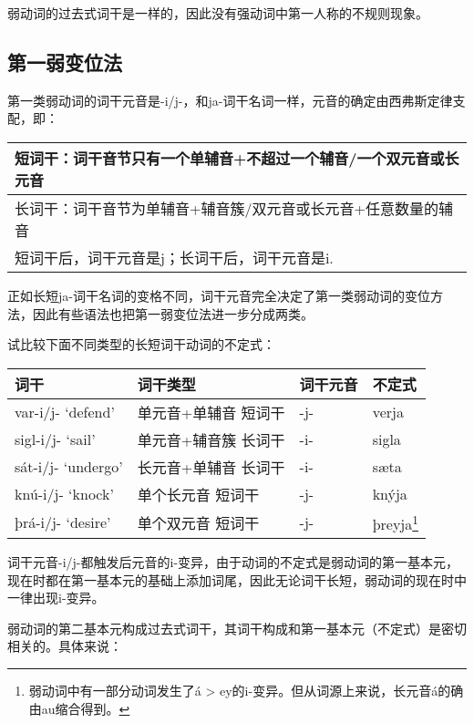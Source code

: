 弱动词的过去式词干是一样的，因此没有强动词中第一人称的不规则现象。

\subsection{第一弱变位法}\label{第一弱变位法}

第一类弱动词的词干元音是-i/j-，和ja-词干名词一样，元音的确定由西弗斯定律支配，即：

\begin{longtable}{l}
  \toprule
  短词干：词干音节只有一个单辅音+不超过一个辅音/一个双元音或长元音 \\
  \midrule
  \endhead
  \bottomrule
  \endfoot
  长词干：词干音节为单辅音+辅音簇/双元音或长元音+任意数量的辅音  \\
  短词干后，词干元音是j；长词干后，词干元音是i.          \\
\end{longtable}

正如长短ja-词干名词的变格不同，词干元音完全决定了第一类弱动词的变位方法，因此有些语法也把第一弱变位法进一步分成两类。

试比较下面不同类型的长短词干动词的不定式：

\begin{longtable}{llll}
  \toprule
  词干                 & 词干类型        & 词干元音 & 不定式                            \\
  \midrule
  \endhead
  \bottomrule
  \endfoot
  var-i/j- `defend‌'  & 单元音+单辅音 短词干 & -j-  & verja                          \\
  sigl-i/j- `sail‌'   & 单元音+辅音簇 长词干 & -i-  & sigla                          \\
  sát-i/j- `undergo‌' & 长元音+单辅音 长词干 & -i-  & sæta                           \\
  knú-i/j- `knock'   & 单个长元音 短词干   & -j-  & knýja                          \\
  þrá-i/j- `desire'  & 单个双元音 短词干   & -j-  & þreyja\footnote{弱动词中有一部分动词发生了á
  \textgreater{} ey的i-变异。但从词源上来说，长元音á的确由au缩合得到。}                           \\
\end{longtable}

词干元音-i/j-都触发后元音的i-变异，由于动词的不定式是弱动词的第一基本元，现在时都在第一基本元的基础上添加词尾，因此无论词干长短，弱动词的现在时中一律出现i-变异。

弱动词的第二基本元构成过去式词干，其词干构成和第一基本元（不定式）是密切相关的。具体来说：

